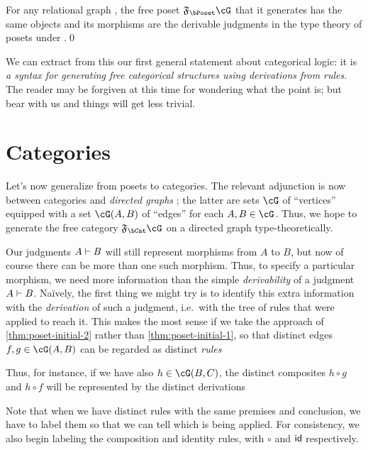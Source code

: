 \begin{thm}\label{thm:poset-initial-2}
  For any relational graph \cG, the free poset $\F{\bPoset}\cG$ that it generates has the same objects and its morphisms are the derivable judgments in the type theory of posets under \cG.\qed
\end{thm}

We can extract from this our first general statement about categorical logic: it is \emph{a syntax for generating free categorical structures using derivations from rules}.
The reader may be forgiven at this time for wondering what the point is; but bear with us and things will get less trivial.


\section{Categories}
\label{sec:categories}

Let's now generalize from posets to categories.
The relevant adjunction is now between categories \bCat and \emph{directed graphs} \bGr; the latter are sets $\cG$ of ``vertices'' equipped with a set $\cG(A,B)$ of ``edges'' for each $A,B\in \cG$.
Thus, we hope to generate the free category $\F{\bCat}\cG$ on a directed graph \cG type-theoretically.

Our judgments $A\vdash B$ will still represent morphisms from $A$ to $B$, but now of course there can be more than one such morphism.
Thus, to specify a particular morphism, we need more information than the simple \emph{derivability} of a judgment $A\vdash B$.
Na\"ively, the first thing we might try is to identify this extra information with the \emph{derivation} of such a judgment, i.e.\ with the tree of rules that were applied to reach it.
This makes the most sense if we take the approach of \cref{thm:poset-initial-2} rather than \cref{thm:poset-initial-1}, so that distinct edges $f,g\in \cG(A,B)$ can be regarded as distinct \emph{rules}
Thus, for instance, if we have also $h\in \cG(B,C)$, the distinct composites $h\circ g$ and $h\circ f$ will be represented by the distinct derivations
Note that when we have distinct rules with the same premises and conclusion, we have to label them so that we can tell which is being applied.
For consistency, we also begin labeling the composition and identity rules, with $\circ$ and $\mathsf{id}$ respectively.


